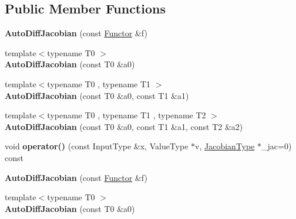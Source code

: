\subsection*{Public Member Functions}
\begin{DoxyCompactItemize}
\item 
\mbox{\label{class_eigen_1_1_auto_diff_jacobian_af28bf6fab1a0dafe1429d6d04acfe396}} 
{\bfseries Auto\+Diff\+Jacobian} (const \hyperlink{struct_functor}{Functor} \&f)
\item 
\mbox{\label{class_eigen_1_1_auto_diff_jacobian_a8e78187ab2df1d09395c9910e182b305}} 
{\footnotesize template$<$typename T0 $>$ }\\{\bfseries Auto\+Diff\+Jacobian} (const T0 \&a0)
\item 
\mbox{\label{class_eigen_1_1_auto_diff_jacobian_a459df1c8203bd0aef5ea3ed964d6e8f1}} 
{\footnotesize template$<$typename T0 , typename T1 $>$ }\\{\bfseries Auto\+Diff\+Jacobian} (const T0 \&a0, const T1 \&a1)
\item 
\mbox{\label{class_eigen_1_1_auto_diff_jacobian_abcc3d282a198c67c3c0b15ee81763f5c}} 
{\footnotesize template$<$typename T0 , typename T1 , typename T2 $>$ }\\{\bfseries Auto\+Diff\+Jacobian} (const T0 \&a0, const T1 \&a1, const T2 \&a2)
\item 
\mbox{\label{class_eigen_1_1_auto_diff_jacobian_a7e9380a43f2f256ad3f00d683a943f1e}} 
void {\bfseries operator()} (const Input\+Type \&x, Value\+Type $\ast$v, \hyperlink{group___core___module_class_eigen_1_1_matrix}{Jacobian\+Type} $\ast$\+\_\+jac=0) const
\item 
\mbox{\label{class_eigen_1_1_auto_diff_jacobian_af28bf6fab1a0dafe1429d6d04acfe396}} 
{\bfseries Auto\+Diff\+Jacobian} (const \hyperlink{struct_functor}{Functor} \&f)
\item 
\mbox{\label{class_eigen_1_1_auto_diff_jacobian_a8e78187ab2df1d09395c9910e182b305}} 
{\footnotesize template$<$typename T0 $>$ }\\{\bfseries Auto\+Diff\+Jacobian} (const T0 \&a0)

\end{DoxyCompactItemize}
